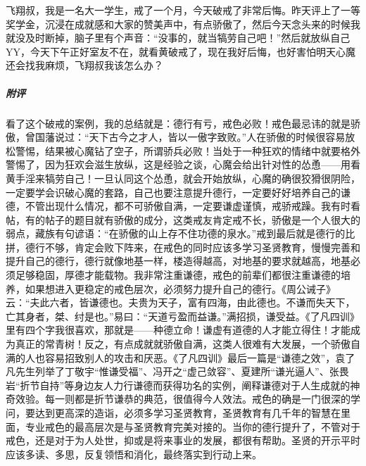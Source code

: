 \begin{case}
    飞翔叔，我是一名大一学生，戒了一个月，今天破戒了非常后悔。昨天评上了一等奖学金，沉浸在成就感和大家的赞美声中，有点骄傲了，然后今天念头来的时候我就没及时断掉，脑子里有个声音：“没事的，就当犒劳自己吧！”然后就放纵自己 YY，今天下午正好室友不在，就看黄破戒了，现在我好后悔，也好害怕明天心魔还会找我麻烦，飞翔叔我该怎么办？
    \subparagraph{附评} 看了这个破戒的案例，我的总结就是：德行有亏，戒色必败！戒色最忌讳的就是骄傲，曾国藩说过：“天下古今之才人，皆以一傲字致败。”人在骄傲的时候很容易放松警惕，结果被心魔钻了空子，所谓骄兵必败！当处于一种狂欢的情绪中就要格外警惕了，因为狂欢会滋生放纵，这是经验之谈，心魔会给出针对性的怂恿——用看黄手淫来犒劳自己！一旦认同这个怂恿，就会开始放纵，心魔的确很狡猾很阴险，一定要学会识破心魔的套路，自己也要注意提升德行，一定要好好培养自己的谦德，不管出现什么情况，都不可骄傲自满，一定要谦虚谨慎，戒骄戒躁。我有时看帖，有的帖子的题目就有骄傲的成分，这类戒友肯定戒不长，骄傲是一个人很大的弱点，藏族有句谚语：“在骄傲的山上存不住功德的泉水。”戒到最后就是德行的比拼，德行不够，肯定会败下阵来，在戒色的同时应该多学习圣贤教育，慢慢完善和提升自己的德行，德行就像地基一样，楼造得越高，对地基的要求就越高，地基必须足够稳固，厚德才能载物。我非常注重谦德，戒色的前辈们都很注重谦德的培养，如果想进入更稳定的戒色层次，必须努力提升自己的德行。《周公诫子》云：“夫此六者，皆谦德也。夫贵为天子，富有四海，由此德也。不谦而失天下，亡其身者，桀、纣是也。”易曰：“天道亏盈而益谦。”满招损，谦受益。《了凡四训》里有四个字我很喜欢，那就是——种德立命！谦虚有道德的人才能立得住！才能成为真正的常青树！反之，有点成就就骄傲自满，这类人很难有大发展，一个骄傲自满的人也容易招致别人的攻击和厌恶。《了凡四训》最后一篇是“谦德之效”，袁了凡先生列举了丁敬宇“惟谦受福”、冯开之“虚己敛容”、夏建所“谦光逼人”、张畏岩“折节自持”等身边友人力行谦德而获得功名的实例，阐释谦德对于人生成就的神奇效验。每一则都是折节谦恭的典范，很值得今人效法。戒色的确是一门很深的学问，要达到更高深的造诣，必须多学习圣贤教育，圣贤教育有几千年的智慧在里面，专业戒色的最高层次是与圣贤教育完美对接的。当你的德行提升了，不管对于戒色，还是对于为人处世，抑或是将来事业的发展，都很有帮助。圣贤的开示平时应该多读、多思，反复领悟和消化，最终落实到行动上来。
\end{case}

